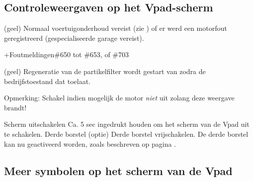 \setupparagraphs [SymVpad][1][width=4em,inner=\hfill]


\subsection{Controleweergaven op het Vpad-scherm} %


\startSymVpad
\externalfigure[vpadWarningService][height=1.7\lH]
\SymVpad
{}(geel) Normaal voertuigonderhoud vereist (zie  ) of er werd een motorfout geregistreerd (gespecialiseerde garage vereist).

+\:Foutmeldingen\#650 tot \#653, of \#703
\stopSymVpad


\startSymVpad
\externalfigure[vpadTDPF][height=1.7\lH]
\SymVpad
{}(geel) Regeneratie van de partikelfilter wordt gestart van zodra de bedrijfstoestand dat toelaat.

{\md Opmerking:} {\lt Schakel indien mogelijk de motor {\em niet} uit zolang deze weergave brandt!}
\stopSymVpad





\bTR\bTD {} \eTD\bTD Scherm uitschakelen \eTD\bTD Ca. 5 sec ingedrukt houden om het scherm van de Vpad uit te schakelen. \eTD\eTR
\bTR\bTD {}
\eTD\bTD Derde borstel  (optie) \eTD\bTD Derde borstel vrijschakelen.
De derde borstel kan nu geactiveerd worden, zoals beschreven op pagina . \eTD\eTR



\startsection [title={De menu's van de Vpad}, reference={vpad:menu}]



\subsection{Meer symbolen op het scherm van de Vpad}





